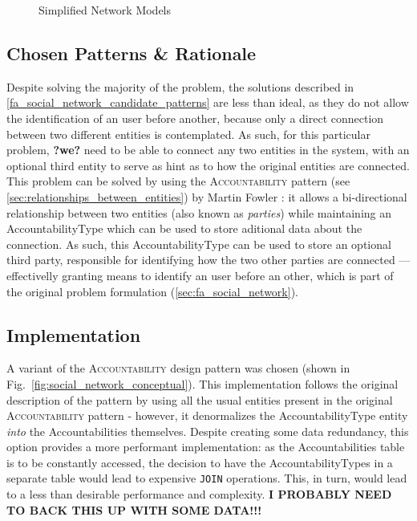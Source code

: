 \begin{figure}[H]
  \centering
  \hspace{20mm}
  \caption{Simplified Network Models}
  \label{fig:simplified_network_models}
\end{figure}

\subsection{Chosen Patterns \& Rationale}\label{sec:fa_social_network_chosen_patterns_rationale}

Despite solving the majority of the problem, the solutions described in \ref{fa_social_network_candidate_patterns} are less than ideal, as they do not allow the identification of an user before another, because only a direct connection between two different entities is contemplated. As such, for this particular problem, \textbf{?we?} need to be able to connect any two entities in the system, with an optional third entity to serve as hint as to how the original entities are connected. This problem can be solved by using the \textsc{Accountability} pattern (see \ref{sec:relationships_between_entities}) by Martin Fowler \cite{fowler_accountability}: it allows a bi-directional relationship between two entities (also known as \emph{parties}) while maintaining an AccountabilityType which can be used to store aditional data about the connection. As such, this AccountabilityType can be used to store an optional third party, responsible for identifying how the two other parties are connected --- effectivelly granting means to identify an user before an other, which is part of the original problem formulation (\ref{sec:fa_social_network}).

\subsection{Implementation}\label{sec:fa_social_network_implementation}

A variant of the \textsc{Accountability} design pattern was chosen (shown in Fig.~\ref{fig:social_network_conceptual}). This implementation follows the original description of the pattern by using all the usual entities present in the original \textsc{Accountability} pattern \cite{fowler_accountability} - however, it denormalizes the AccountabilityType entity \emph{into} the Accountabilities themselves. Despite creating some data redundancy, this option provides a more performant implementation: as the Accountabilities table is to be constantly accessed, the decision to have the AccountabilityTypes in a separate table would lead to expensive \verb!JOIN! operations. This, in turn, would lead to a less than desirable performance and complexity. \textbf{I PROBABLY NEED TO BACK THIS UP WITH SOME DATA!!!}

